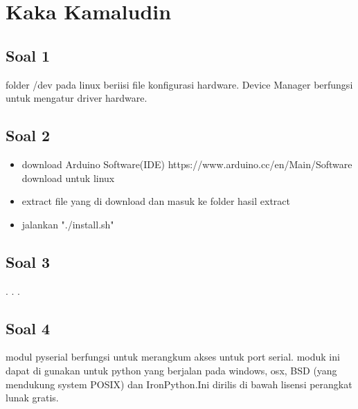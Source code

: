 




\section{Kaka Kamaludin}
\subsection{Soal 1}
folder /dev pada linux beriisi file konfigurasi hardware.
Device Manager berfungsi untuk mengatur driver hardware.

\subsection{Soal 2}
\begin{itemize}
	\item download Arduino Software(IDE)  
		https://www.arduino.cc/en/Main/Software
		download untuk linux
	\item extract file yang di download dan masuk ke folder hasil extract
	\item jalankan "./install.sh"
\end{itemize}

\subsection{Soal 3}
. . .

\subsection{Soal 4}
modul pyserial berfungsi untuk merangkum akses untuk port serial. moduk ini dapat di gunakan untuk python yang berjalan pada windows, osx, BSD (yang mendukung system POSIX) dan IronPython.Ini dirilis di bawah lisensi perangkat lunak gratis.

